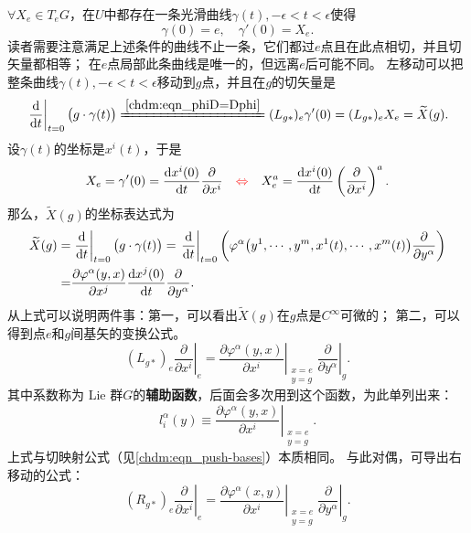 $\forall X_e \in T_eG$，在$U$中都存在一条光滑曲线$\gamma(t),-\epsilon < t < \epsilon$使得
\begin{equation}
    \gamma(0)=e,\quad \gamma'(0)=X_e .
\end{equation}
读者需要注意满足上述条件的曲线不止一条，它们都过$e$点且在此点相切，并且切矢量都相等；
在$e$点局部此条曲线是唯一的，但远离$e$后可能不同。
左移动可以把整条曲线$\gamma(t),-\epsilon < t < \epsilon$移动到$g$点，并且在$g$的切矢量是
\begin{equation}\label{chlg:eqn_tmpl10}
    \left. \frac{\rm d}{{\rm d}t} \right|_{t=0} \bigl(g\cdot \gamma(t) \bigr)
    \xlongequal{\ref{chdm:eqn_phiD=Dphi}} (L_{g*})_e \gamma'(0) = (L_{g*})_e X_e  = \widetilde{X}(g) .
\end{equation}
设$\gamma(t)$的坐标是$x^i(t)$，于是
\begin{equation}
    X_e =\gamma'(0)= \frac{{\rm d} x^i(0)}{{\rm d}t} \frac{\partial }{\partial x^i}
    \quad {\color{red}\Leftrightarrow} \quad
    X^a_e = \frac{{\rm d} x^i(0)}{{\rm d}t} \left(\frac{\partial }{\partial x^i}\right)^a .
\end{equation}
那么，$\widetilde{X}(g)$的坐标表达式为
\begin{align*}
    \widetilde{X}(g)=& \left. \frac{\rm d}{{\rm d}t} \right|_{t=0} \bigl(g\cdot \gamma(t) \bigr)
      =\left. \frac{\rm d}{{\rm d}t} \right|_{t=0} \left( \varphi^\alpha \bigl(y^1,\cdots,y^m, 
      x^1(t),\cdots,x^m(t) \bigr)  \frac{\partial}{\partial y^\alpha} \right) \\
    =& \frac{\partial \varphi^\alpha (y,x)}{\partial x^j} \frac{{\rm d} x^j(0)}{{\rm d}t} 
      \frac{\partial}{\partial y^\alpha} .
\end{align*}
从上式可以说明两件事：第一，可以看出$\widetilde{X}(g)$在$g$点是$C^\infty$可微的；
第二，可以得到点$e$和$g$间基矢的变换公式。
\begin{equation}\label{chlg:eqn_lve}
    (L_{g*})_e\left. \frac{\partial }{\partial x^i }\right|_{e}
    = \left. \frac{\partial \varphi^\alpha (y,x)}{\partial x^i} 
    \right|_{\substack{x=e\\y=g}}   \left. \frac{\partial}{\partial y^\alpha}\right|_{g} .
\end{equation}
其中系数称为 Lie 群$G$的\textbf{辅助函数}，后面会多次用到这个函数，为此单列出来：
\begin{equation}\label{chlg:eqn_auxiliaryfun}
    l^\alpha_i(y)\equiv \left. \frac{\partial \varphi^\alpha (y,x)}
     {\partial x^i}\right|_{\substack{x=e\\y=g}}.
\end{equation} 
上式与切映射公式（见\eqref{chdm:eqn_push-bases}）本质相同。
与此对偶，可导出右移动的公式： %
\begin{equation}\label{chlg:eqn_rve}
    (R_{g*})_e \left. \frac{\partial }{\partial x^i }\right|_{e}
     = \left. \frac{\partial \varphi^\alpha (x,y)}{\partial x^i} 
    \right|_{\substack{x=e\\y=g}}   \left. \frac{\partial}{\partial y^\alpha}\right|_{g} .
\end{equation}


